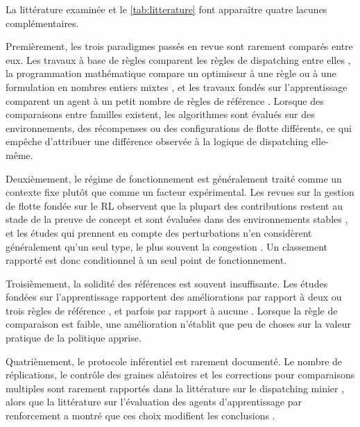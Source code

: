 \documentclass[11pt,a4paper]{article}
\newif\ifrevmarks
\newcommand{\revtag}[1]{\ifrevmarks\textsuperscript{\textcolor{red!70!black}{\scriptsize[#1]}}\fi}
\newenvironment{revbloc}[1]{\par\ifrevmarks\color{revcolor}\noindent\revtag{#1}\ \fi}{\par}
\begin{document}
\begin{revbloc}{M24 (fusion §1.3, §2.4, §3)}
La littérature examinée et le \cref{tab:litterature} font apparaître quatre lacunes complémentaires.

Premièrement, les trois paradigmes passés en revue sont rarement comparés entre eux. Les travaux à base de règles comparent les règles de dispatching entre elles \cite{Alarie2002, MehrnazMohtasham2023, Zeng2022}, la programmation mathématique compare un optimiseur à une règle ou à une formulation en nombres entiers mixtes \cite{Soumis1989, AmandaSmith2020}, et les travaux fondés sur l'apprentissage comparent un agent à un petit nombre de règles de référence \cite{deCarvalho2023, Zhao2025}. Lorsque des comparaisons entre familles existent, les algorithmes sont évalués sur des environnements, des récompenses ou des configurations de flotte différents, ce qui empêche d'attribuer une différence observée à la logique de dispatching elle-même.

Deuxièmement, le régime de fonctionnement est généralement traité comme un contexte fixe plutôt que comme un facteur expérimental. Les revues sur la gestion de flotte fondée sur le RL observent que la plupart des contributions restent au stade de la preuve de concept et sont évaluées dans des environnements stables \cite{Hazrathosseini2024}, et les études qui prennent en compte des perturbations n'en considèrent généralement qu'un seul type, le plus souvent la congestion \cite{Zeng2022}. Un classement rapporté est donc conditionnel à un seul point de fonctionnement.

Troisièmement, la solidité des références est souvent insuffisante. Les études fondées sur l'apprentissage rapportent des améliorations par rapport à deux ou trois règles de référence \cite{Zhao2025}, et parfois par rapport à aucune \cite{deCarvalho2023}. Lorsque la règle de comparaison est faible, une amélioration n'établit que peu de choses sur la valeur pratique de la politique apprise.

Quatrièmement, le protocole inférentiel est rarement documenté. Le nombre de réplications, le contrôle des graines aléatoires et les corrections pour comparaisons multiples sont rarement rapportés dans la littérature sur le dispatching minier \cite{MehrnazMohtasham2023, MiladAbolghasemian2020, BurakOzdemir2019}, alors que la littérature sur l'évaluation des agents d'apprentissage par renforcement a montré que ces choix modifient les conclusions \cite{Henderson2018, Agarwal2021}.
\end{revbloc}
\end{document}
